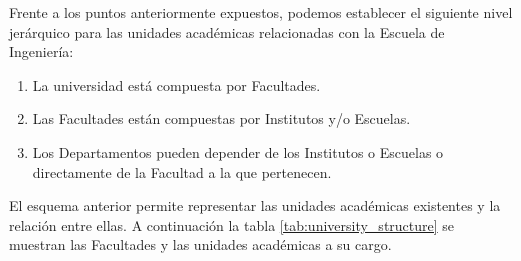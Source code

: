 Frente a los puntos anteriormente expuestos, podemos establecer el siguiente nivel jerárquico para las unidades académicas relacionadas con la Escuela de Ingeniería:

\begin{enumerate}
  \item La universidad está compuesta por Facultades.
  \item Las Facultades están compuestas por Institutos y/o Escuelas.
  \item Los Departamentos pueden depender de los Institutos o Escuelas o directamente de la Facultad a la que pertenecen.
\end{enumerate}

El esquema anterior permite representar las unidades académicas existentes y la relación entre ellas. A continuación la tabla \ref{tab:university_structure} se muestran las Facultades y las unidades académicas a su cargo.


